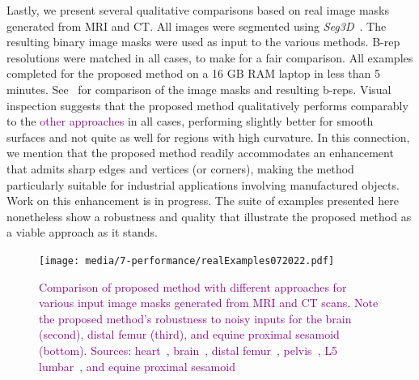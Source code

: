 Lastly, we present several qualitative comparisons based on real image masks generated from MRI and CT.  All images were segmented using \textit{Seg3D}~\cite{Seg3D}. The resulting binary image masks were used as input to the various methods. B-rep resolutions were matched in all cases, to make for a fair comparison. All examples completed for the proposed method on a 16 GB RAM laptop in less than 5 minutes. See~ for comparison of the image masks and resulting b-reps. Visual inspection suggests that the proposed method qualitatively performs comparably to the \textcolor{purple}{other approaches} in all cases, performing slightly better for smooth surfaces and not quite as well for regions with high curvature. In this connection, we mention that the proposed method readily accommodates an enhancement that admits sharp edges and vertices (or corners), making the method particularly suitable for industrial applications involving manufactured objects.  Work on this enhancement is in progress.  The suite of examples presented here nonetheless show a robustness and quality that illustrate the proposed method as a viable approach as it stands.
%
\begin{figure}[h!]
	\centering
	 \texttt{[image: media/7-performance/realExamples072022.pdf]}
	\caption{\textcolor{purple}{Comparison of proposed method with different approaches for various input image masks generated from MRI and CT scans. Note the proposed method's robustness to noisy inputs for the brain (second), distal femur (third), and equine proximal sesamoid (bottom). Sources: heart~\cite{cvgg}, brain~\cite{marcus_2007}, distal femur~\cite{epperson_2013}, pelvis~\cite{clark_2013}, L5 lumbar~\cite{yao_2016}, and equine proximal sesamoid~\cite{shaffer2021}}}
	\label{fig:example-meshes}
\end{figure} \\
%
